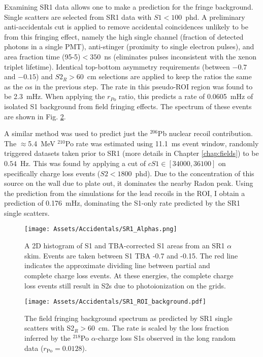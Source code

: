 Examining SR1 data allows one to make a prediction for the fringe background.
Single scatters are selected from SR1 data with $S1<100$~phd.
A preliminary anti-accidentals cut is applied to remove accidental coincidences unlikely to be from this fringing effect, namely the high single channel (fraction of detected photons in a single PMT), anti-stinger (proximity to single electron pulses), and area fraction time (95-5)$<350$~ns (eliminates pulses inconsistent with the xenon triplet lifetime).
Identical top-bottom asymmetry requirements (between $-0.7$ and $-0.15$) and $S2_R>60$~cm selections are applied to keep the ratios the same as the $\alpha$s in the previous step.
The rate in this pseudo-ROI region was found to be 2.3~mHz.
When applying the $r_{Po}$ ratio, this predicts a rate of 0.0605~mHz of isolated S1 background from field fringing effects.
The spectrum of these events are shown in Fig. \ref{fig:field_fringing_spectrum}.

A similar method was used to predict just the $^{206}$Pb nuclear recoil contribution.
The $\approx$5.4~MeV $^{210}$Po rate was estimated using 11.1~ms event window, randomly triggered datasets taken prior to SR1 (more details in Chapter \ref{chap:fields}) to be $0.54$~Hz.
This was found by applying a cut of $cS1\in [34000,36100]$ on specifically charge loss events ($S2 < 1800$~phd).
Due to the concentration of this source on the wall due to plate out, it dominates the nearby Radon peak.
Using the prediction from the simulations for the lead recoils in the ROI, I obtain a prediction of 0.176~mHz, dominating the S1-only rate predicted by the SR1 single scatters.








\begin{figure}
    \centering
    \texttt{[image: Assets/Accidentals/SR1\_Alphas.png]}
    \caption[A 2D histogram of S1 and TBA-corrected S1 areas from an SR1 $\alpha$ skim.]%
    {A 2D histogram of S1 and TBA-corrected S1 areas from an SR1 $\alpha$ skim. Events are taken between S1 TBA -0.7 and -0.15. The red line indicates the approximate dividing line between partial and complete charge loss events.
    At these energies, the complete charge loss events still result in S2s due to photoionization on the grids.}
    \label{fig:sr1_alpha}
\end{figure}
\begin{figure}
    \centering
    \texttt{[image: Assets/Accidentals/SR1\_ROI\_background.pdf]}
    \caption[The field fringing background spectrum as predicted by SR1 single scatters with S2$_R>60$~cm. ]%
    {The field fringing background spectrum as predicted by SR1 single scatters with S2$_R>60$~cm. 
    The rate is scaled by the loss fraction inferred by the  $^{218}$Po $\alpha$-charge loss S1s observed in the long random data ($r_{\mathrm{Po}}=0.0128$).}
    \label{fig:field_fringing_spectrum}
\end{figure}

